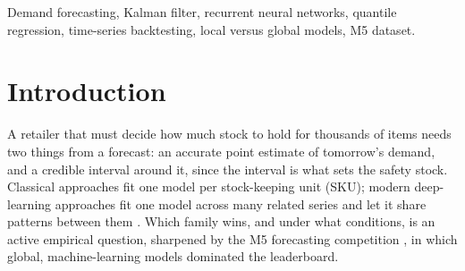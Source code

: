 \documentclass[conference]{IEEEtran}
\begin{document}
\begin{IEEEkeywords}
Demand forecasting, Kalman filter, recurrent neural networks, quantile regression, time-series
backtesting, local versus global models, M5 dataset.
\end{IEEEkeywords}

\section{Introduction}

A retailer that must decide how much stock to hold for thousands of items needs two things from a
forecast: an accurate point estimate of tomorrow's demand, and a credible interval around it, since
the interval is what sets the safety stock. Classical approaches fit one model per stock-keeping
unit (SKU); modern deep-learning approaches fit one model across many related series and let it
share patterns between them \cite{montero2021}. Which family wins, and under what conditions, is
an active empirical question, sharpened by the M5 forecasting competition
\cite{makridakis2022}, in which global, machine-learning models dominated the leaderboard.
\end{document}
